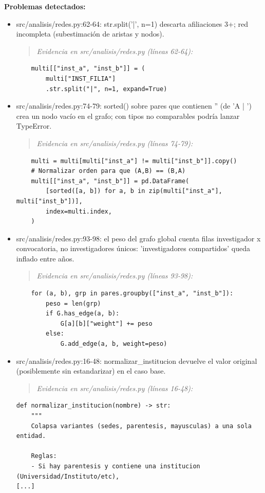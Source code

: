 \begin{tcolorbox}[riesgo]
\textbf{Problemas detectados:}
\begin{itemize}
  \item src/analisis/redes.py:62-64: str.split('|', n=1) descarta afiliaciones 3+; red incompleta (subestimación de aristas y nodos).
\begin{quote}\footnotesize\ttfamily
\noindent\emph{Evidencia en src/analisis/redes.py (líneas 62-64):}
\end{quote}
\begin{lstlisting}
    multi[["inst_a", "inst_b"]] = (
        multi["INST_FILIA"]
        .str.split("|", n=1, expand=True)
\end{lstlisting}

  \item src/analisis/redes.py:74-79: sorted() sobre pares que contienen '' (de 'A | ') crea un nodo vacío en el grafo; con tipos no comparables podría lanzar TypeError.
\begin{quote}\footnotesize\ttfamily
\noindent\emph{Evidencia en src/analisis/redes.py (líneas 74-79):}
\end{quote}
\begin{lstlisting}
    multi = multi[multi["inst_a"] != multi["inst_b"]].copy()
    # Normalizar orden para que (A,B) == (B,A)
    multi[["inst_a", "inst_b"]] = pd.DataFrame(
        [sorted([a, b]) for a, b in zip(multi["inst_a"], multi["inst_b"])],
        index=multi.index,
    )
\end{lstlisting}

  \item src/analisis/redes.py:93-98: el peso del grafo global cuenta filas investigador x convocatoria, no investigadores únicos: 'investigadores compartidos' queda inflado entre años.
\begin{quote}\footnotesize\ttfamily
\noindent\emph{Evidencia en src/analisis/redes.py (líneas 93-98):}
\end{quote}
\begin{lstlisting}
    for (a, b), grp in pares.groupby(["inst_a", "inst_b"]):
        peso = len(grp)
        if G.has_edge(a, b):
            G[a][b]["weight"] += peso
        else:
            G.add_edge(a, b, weight=peso)
\end{lstlisting}

  \item src/analisis/redes.py:16-48: normalizar\_institucion devuelve el valor original (posiblemente sin estandarizar) en el caso base.
\begin{quote}\footnotesize\ttfamily
\noindent\emph{Evidencia en src/analisis/redes.py (líneas 16-48):}
\end{quote}
\begin{lstlisting}
def normalizar_institucion(nombre) -> str:
    """
    Colapsa variantes (sedes, parentesis, mayusculas) a una sola entidad.

    Reglas:
    - Si hay parentesis y contiene una institucion (Universidad/Instituto/etc),
[...]
\end{lstlisting}

\end{itemize}
\end{tcolorbox}

